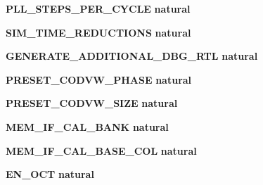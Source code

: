 \begin{DoxyCompactItemize}
{\bf P\+L\+L\+\_\+\+S\+T\+E\+P\+S\+\_\+\+P\+E\+R\+\_\+\+C\+Y\+C\+LE} {\bfseries {\bfseries \textcolor{comment}{natural}\textcolor{vhdlchar}{ }}}
\item 
{\bf S\+I\+M\+\_\+\+T\+I\+M\+E\+\_\+\+R\+E\+D\+U\+C\+T\+I\+O\+NS} {\bfseries {\bfseries \textcolor{comment}{natural}\textcolor{vhdlchar}{ }}}
\item 
{\bf G\+E\+N\+E\+R\+A\+T\+E\+\_\+\+A\+D\+D\+I\+T\+I\+O\+N\+A\+L\+\_\+\+D\+B\+G\+\_\+\+R\+TL} {\bfseries {\bfseries \textcolor{comment}{natural}\textcolor{vhdlchar}{ }}}
\item 
{\bf P\+R\+E\+S\+E\+T\+\_\+\+C\+O\+D\+V\+W\+\_\+\+P\+H\+A\+SE} {\bfseries {\bfseries \textcolor{comment}{natural}\textcolor{vhdlchar}{ }}}
\item 
{\bf P\+R\+E\+S\+E\+T\+\_\+\+C\+O\+D\+V\+W\+\_\+\+S\+I\+ZE} {\bfseries {\bfseries \textcolor{comment}{natural}\textcolor{vhdlchar}{ }}}
\item 
{\bf M\+E\+M\+\_\+\+I\+F\+\_\+\+C\+A\+L\+\_\+\+B\+A\+NK} {\bfseries {\bfseries \textcolor{comment}{natural}\textcolor{vhdlchar}{ }}}
\item 
{\bf M\+E\+M\+\_\+\+I\+F\+\_\+\+C\+A\+L\+\_\+\+B\+A\+S\+E\+\_\+\+C\+OL} {\bfseries {\bfseries \textcolor{comment}{natural}\textcolor{vhdlchar}{ }}}
\item 
{\bf E\+N\+\_\+\+O\+CT} {\bfseries {\bfseries \textcolor{comment}{natural}\textcolor{vhdlchar}{ }}}
\end{DoxyCompactItemize}
